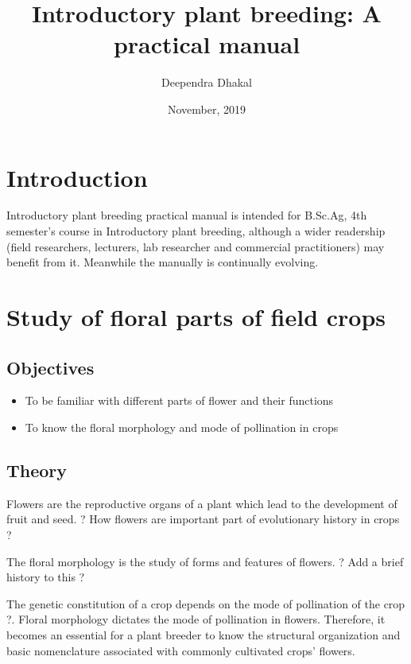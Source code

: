 \documentclass[]{book}
\title{Introductory plant breeding: A practical manual}
\author{Deependra Dhakal}
\date{November, 2019}
\providecommand{\tightlist}{%
  \setlength{\itemsep}{0pt}\setlength{\parskip}{0pt}}
\begin{document}
\maketitle

{
\setcounter{tocdepth}{1}
\tableofcontents
}
\hypertarget{introduction}{%
\chapter{Introduction}\label{introduction}}

Introductory plant breeding practical manual is intended for B.Sc.Ag, 4th semester's course in Introductory plant breeding, although a wider readership (field researchers, lecturers, lab researcher and commercial practitioners) may benefit from it. Meanwhile the manually is continually evolving.

\hypertarget{practical-1}{%
\chapter{Study of floral parts of field crops}\label{practical-1}}

\hypertarget{objectives}{%
\section{Objectives}\label{objectives}}

\begin{itemize}
\tightlist
\item
  To be familiar with different parts of flower and their functions
\item
  To know the floral morphology and mode of pollination in crops
\end{itemize}

\hypertarget{theory}{%
\section{Theory}\label{theory}}

Flowers are the reproductive organs of a plant which lead to the development of fruit and seed. ? How flowers are important part of evolutionary history in crops ?

The floral morphology is the study of forms and features of flowers. ? Add a brief history to this ?

The genetic constitution of a crop depends on the mode of pollination of the crop ?. Floral morphology dictates the mode of pollination in flowers. Therefore, it becomes an essential for a plant breeder to know the structural organization and basic nomenclature associated with commonly cultivated crops' flowers.
\end{document}
